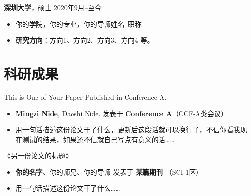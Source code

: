 \documentclass[11pt]{article}
\newlength{\iconwidth}
\begin{document}
\begin{minipage}[t]{0.78\textwidth}
\begin{minipage}[t]{\textwidth}
        \vspace{0.5em}
        {\large \textbf{深圳大学}}，硕士 \hfill 2020年9月--至今
        \begin{itemize}
            \item 你的学院，你的专业，你的导师姓名\ 职称
            \item \textbf{研究方向}：方向1、方向2、方向3、方向4 等。
        \end{itemize}
        
        \vspace{1.2em}
        \end{minipage}
    \end{minipage}
    \hfill
    \begin{minipage}[t]{0.2\textwidth}
        \vspace{2em}
        \setlength{\fboxsep}{0pt}
    \end{minipage}

    \begin{minipage}[t]{\textwidth}
    \section[科研成果]{\makebox[\iconwidth][c]{\color{primary_color}{\Large $\bullet$}}\quad 科研成果}

    This is One of Your Paper Published in Conference A.
    \begin{itemize}
        \item \textbf{Mingzi Nide}, Daoshi Nide. \hfill 发表于 \textbf{Conference A}（CCF-A类会议）
        \item 用一句话描述这份论文干了什么，更新后这段话就可以换行了，不信你看我现在测试的结果，如果还不信就自己写点有意义的话……
    \end{itemize}

    \vspace{0.5em}
    《另一份论文的标题》
    \begin{itemize}
        \item  \textbf{你的名字}、你的师兄、你的导师 \hfill 发表于 \textbf{某篇期刊} （SCI-1区）
        \item 用一句话描述这份论文干了什么……
    \end{itemize}
    
    \vspace{1.2em}
    \end{minipage}
\end{document}
